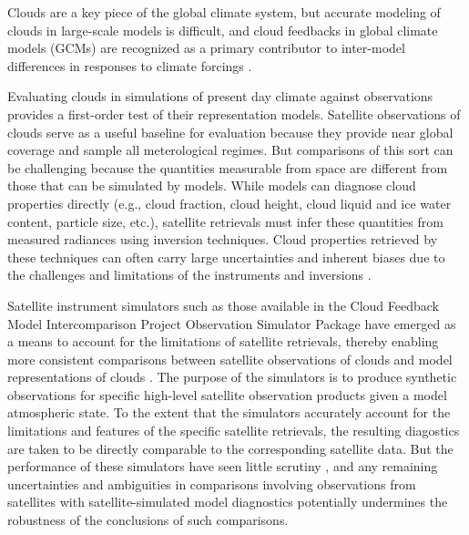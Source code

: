 \documentclass{article}
\begin{document}
Clouds are a key piece of the global climate system, but accurate modeling of clouds in large-scale models is difficult, and cloud feedbacks in global climate models (GCMs) are recognized as a primary contributor to inter-model differences in responses to climate forcings \citep[e.g.,][]{cess_et_al_1990,bony_and_dufresne_2005,williams_and_webb_2009,medeiros_et_al_2008}. 

Evaluating clouds in simulations of present day climate against observations provides a first-order test of their representation models. Satellite observations of clouds serve as a useful baseline for evaluation because they provide near global coverage and sample all meterological regimes. But comparisons of this sort can be challenging because the quantities measurable from space are different from those that can be simulated by models. While models can diagnose cloud properties directly (e.g., cloud fraction, cloud height, cloud liquid and ice water content, particle size, etc.), satellite retrievals must infer these quantities from measured radiances using inversion techniques. Cloud properties retrieved by these techniques can often carry large uncertainties and inherent biases due to the challenges and limitations of the instruments and inversions \citep[e.g.,][]{marchand_et_al_2010,pincus_et_al_2012}.

Satellite instrument simulators such as those available in the Cloud Feedback Model Intercomparison Project \citep[CFMIP;][]{bony_et_al_2011} Observation Simulator Package \citep[COSP;][]{bodas-salcedo_et_al_2011} have emerged as a means to account for the limitations of satellite retrievals, thereby enabling more consistent comparisons between satellite observations of clouds and model representations of clouds \citep[e.g.,][]{klein_and_jakob_1999,bodas-salcedo_et_al_2011,zhang_et_al_2005,marchand_and_ackerman_2010,kay_et_al_2012,klein_et_al_2013,pincus_et_al_2012}. The purpose of the simulators is to produce synthetic observations for specific high-level satellite observation products given a model atmospheric state. To the extent that the simulators accurately account for the limitations and features of the specific satellite retrievals, the resulting diagostics are taken to be directly comparable to the corresponding satellite data. But the performance of these simulators have seen little scrutiny \citep{mace_et_al_2010}, and any remaining uncertainties and ambiguities in comparisons involving observations from satellites with satellite-simulated model diagnostics potentially undermines the robustness of the conclusions of such comparisons.
\end{document}
